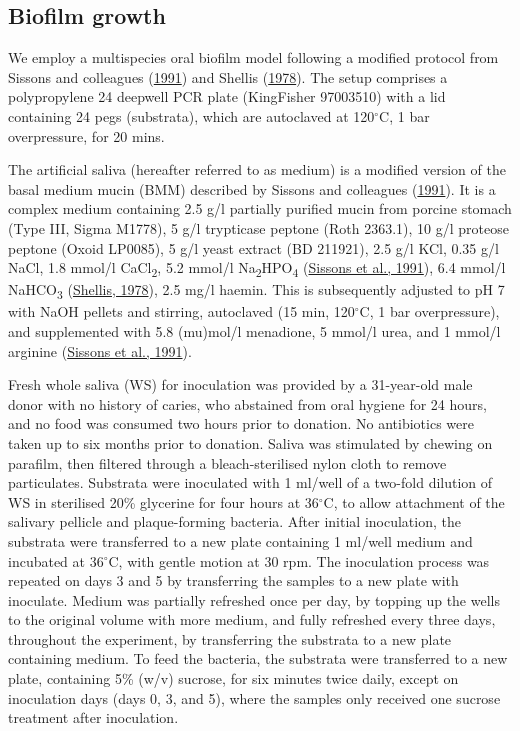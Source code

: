 \documentclass[
  letterpaper,
]{book}
\begin{document}
\hypertarget{biofilm-growth}{%
\subsection{Biofilm growth}\label{biofilm-growth}}

We employ a multispecies oral biofilm model following a modified
protocol from Sissons and colleagues
(\protect\hyperlink{ref-sissonsMultistationPlaque1991}{1991}) and
Shellis (\protect\hyperlink{ref-shellisSyntheticSaliva1978}{1978}). The
setup comprises a polypropylene 24 deepwell PCR plate (KingFisher
97003510) with a lid containing 24 pegs (substrata), which are
autoclaved at 120\(^{\circ}\)C, 1 bar overpressure, for 20 mins.

The artificial saliva (hereafter referred to as medium) is a modified
version of the basal medium mucin (BMM) described by Sissons and
colleagues
(\protect\hyperlink{ref-sissonsMultistationPlaque1991}{1991}). It is a
complex medium containing 2.5 g/l partially purified mucin from porcine
stomach (Type III, Sigma M1778), 5 g/l trypticase peptone (Roth 2363.1),
10 g/l proteose peptone (Oxoid LP0085), 5 g/l yeast extract (BD 211921),
2.5 g/l KCl, 0.35 g/l NaCl, 1.8 mmol/l CaCl\textsubscript{2}, 5.2 mmol/l
Na\textsubscript{2}HPO\textsubscript{4}
(\protect\hyperlink{ref-sissonsMultistationPlaque1991}{Sissons et al.,
1991}), 6.4 mmol/l NaHCO\textsubscript{3}
(\protect\hyperlink{ref-shellisSyntheticSaliva1978}{Shellis, 1978}), 2.5
mg/l haemin. This is subsequently adjusted to pH 7 with NaOH pellets and
stirring, autoclaved (15 min, 120\(^{\circ}\)C, 1 bar overpressure), and
supplemented with 5.8 (mu)mol/l menadione, 5 mmol/l urea, and 1 mmol/l
arginine (\protect\hyperlink{ref-sissonsMultistationPlaque1991}{Sissons
et al., 1991}).

Fresh whole saliva (WS) for inoculation was provided by a 31-year-old
male donor with no history of caries, who abstained from oral hygiene
for 24 hours, and no food was consumed two hours prior to donation. No
antibiotics were taken up to six months prior to donation. Saliva was
stimulated by chewing on parafilm, then filtered through a
bleach-sterilised nylon cloth to remove particulates. Substrata were
inoculated with 1 ml/well of a two-fold dilution of WS in sterilised
20\% glycerine for four hours at 36\(^{\circ}\)C, to allow attachment of
the salivary pellicle and plaque-forming bacteria. After initial
inoculation, the substrata were transferred to a new plate containing 1
ml/well medium and incubated at 36\(^{\circ}\)C, with gentle motion at
30 rpm. The inoculation process was repeated on days 3 and 5 by
transferring the samples to a new plate with inoculate. Medium was
partially refreshed once per day, by topping up the wells to the
original volume with more medium, and fully refreshed every three days,
throughout the experiment, by transferring the substrata to a new plate
containing medium. To feed the bacteria, the substrata were transferred
to a new plate, containing 5\% (w/v) sucrose, for six minutes twice
daily, except on inoculation days (days 0, 3, and 5), where the samples
only received one sucrose treatment after inoculation.
\end{document}
